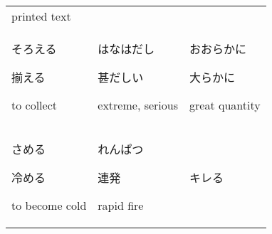 \documentclass[12pt, a4j, landscape, dvipdfmx]{utarticle}
\begin{document}
\begin{minipage}[t][0pt]{\linewidth }
\begin{tabular}{||p{5.5cm}||p{5.5cm}||p{5.5cm}||}
            \hspace*{.425cm} {\small
            printed text}\tabularnewline
            \hhline{|:=::=::=:|} \rule{0pt}{3ex}
            \hspace*{-.4cm} {\LARGE そろえる}\newline
            \rule{0pt}{3ex} \hspace*{.4cm} {\small
            揃える}\newline \rule{0pt}{3ex} \hspace*{.425cm}
            {\small to collect}&\rule{0pt}{3ex}
            \hspace*{-.4cm} {\LARGE はなはだし}\newline
            \rule{0pt}{3ex} \hspace*{.4cm} {\small
            甚だしい}\newline \rule{0pt}{3ex} \hspace*{.425cm}
            {\small extreme, serious}&\rule{0pt}{3ex}
            \hspace*{-.4cm} {\LARGE おおらかに}\newline
            \rule{0pt}{3ex} \hspace*{.4cm} {\small
            大らかに}\newline \rule{0pt}{3ex} \hspace*{.425cm}
            {\small great quantity}\tabularnewline
            \hhline{|:=::=::=:|} \rule{0pt}{3ex}
            \hspace*{-.4cm} {\LARGE さめる}\newline
            \rule{0pt}{3ex} \hspace*{.4cm} {\small
            冷める}\newline \rule{0pt}{3ex} \hspace*{.425cm}
            {\small to become cold}&\rule{0pt}{3ex}
            \hspace*{-.4cm} {\LARGE れんぱつ}\newline
            \rule{0pt}{3ex} \hspace*{.4cm} {\small
            連発}\newline \rule{0pt}{3ex} \hspace*{.425cm}
            {\small rapid fire}&\rule{0pt}{3ex}
            \hspace*{-.4cm} {\LARGE キレる}\newline
            \rule{0pt}{3ex} \hspace*{.4cm} {\small }\newline
            \rule{0pt}{3ex} \hspace*{.425cm} {\small
}
\end{tabular}
\end{minipage}
\end{document}
